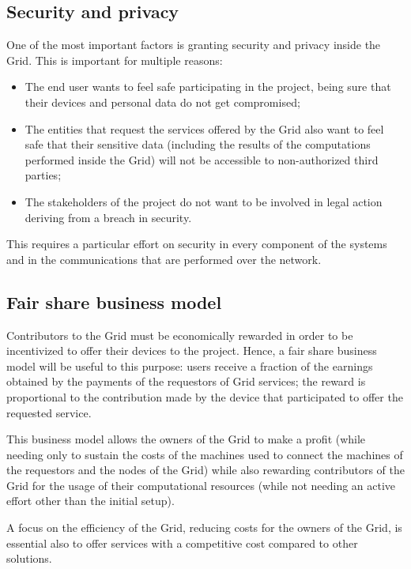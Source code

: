 \subsection{Security and privacy}
One of the most important factors is granting security and privacy inside the Grid. This is important for multiple reasons:
\begin{itemize}
    \item The end user wants to feel safe participating in the project, being sure that their devices and personal data do not get compromised;
    \item The entities that request the services offered by the Grid also want to feel safe that their sensitive data (including the results of the computations performed inside the Grid) will not be accessible to non-authorized third parties;
    \item The stakeholders of the project do not want to be involved in legal action deriving from a breach in security.
\end{itemize}

This requires a particular effort on security in every component of the systems and in the communications that are performed over the network.

\subsection{Fair share business model}
Contributors to the Grid must be economically rewarded in order to be incentivized to offer their devices to the project. Hence, a fair share business model will be useful to this purpose: users receive a fraction of the earnings obtained by the payments of the requestors of Grid services; the reward is proportional to the contribution made by the device that participated to offer the requested service.

This business model allows the owners of the Grid to make a profit (while needing only to sustain the costs of the machines used to connect the machines of the requestors and the nodes of the Grid) while also rewarding contributors of the Grid for the usage of their computational resources (while not needing an active effort other than the initial setup).

A focus on the efficiency of the Grid, reducing costs for the owners of the Grid, is essential also to offer services with a competitive cost compared to other solutions.
